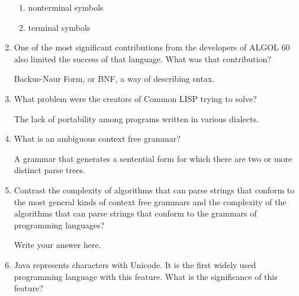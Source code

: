 \begin{enumerate}
\begin{answer}
  \begin{enumerate}
    \item nonterminal symbols
    \item terminal symbols
    \end{enumerate}

    \end{answer}


  \item One of the most significant contributions from the developers
    of ALGOL 60 also limited the success of that language. What was
    that contribution?

  \begin{answer}

    Backus-Naur Form, or BNF, a way of describing sntax.

    \end{answer}

  \item What problem were the creators of Common LISP trying to solve?

  \begin{answer}

    The lack of portability among programs written in various dialects.

    \end{answer}

  \item What is an ambiguous context free grammar?

  \begin{answer}

    A grammar that generates a sentential form for which there are two or more distinct parse trees.

    \end{answer}

  \item Contrast the complexity of algorithms that can parse strings
    that conform to the most general kinds of context free grammars
    and the complexity of the algorithms that can parse strings that
    conform to the grammars of programming languages?

  \begin{answer}

    Write your answer here.

    \end{answer}

  \item Java represents characters with Unicode. It is the first
    widely used programming language with this feature. What is the
    significance of this feature?


\end{enumerate}
